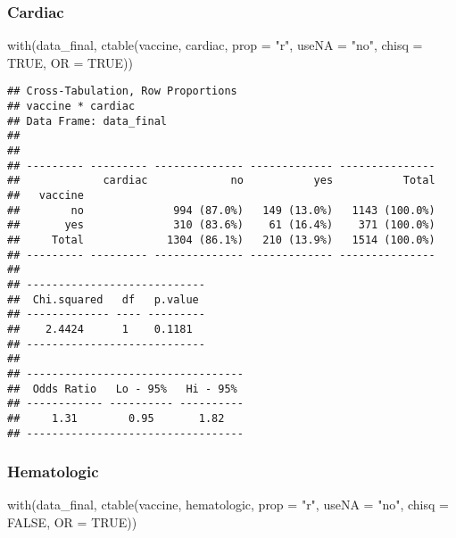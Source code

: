 \documentclass[
]{article}
\newenvironment{Shaded}{\begin{snugshade}}{\end{snugshade}}
\newcommand{\AttributeTok}[1]{\textcolor[rgb]{0.77,0.63,0.00}{#1}}
\newcommand{\ConstantTok}[1]{\textcolor[rgb]{0.00,0.00,0.00}{#1}}
\newcommand{\FunctionTok}[1]{\textcolor[rgb]{0.00,0.00,0.00}{#1}}
\newcommand{\NormalTok}[1]{#1}
\newcommand{\StringTok}[1]{\textcolor[rgb]{0.31,0.60,0.02}{#1}}
\begin{document}
\hypertarget{cardiac}{%
\subsubsection{Cardiac}\label{cardiac}}

\begin{Shaded}
\begin{Highlighting}[]
\FunctionTok{with}\NormalTok{(data\_final, }\FunctionTok{ctable}\NormalTok{(vaccine, cardiac, }\AttributeTok{prop =} \StringTok{"r"}\NormalTok{, }\AttributeTok{useNA =} \StringTok{"no"}\NormalTok{, }\AttributeTok{chisq =} \ConstantTok{TRUE}\NormalTok{, }\AttributeTok{OR =} \ConstantTok{TRUE}\NormalTok{))}
\end{Highlighting}
\end{Shaded}

\begin{verbatim}
## Cross-Tabulation, Row Proportions  
## vaccine * cardiac  
## Data Frame: data_final  
## 
## 
## --------- --------- -------------- ------------- ---------------
##             cardiac             no           yes           Total
##   vaccine                                                       
##        no              994 (87.0%)   149 (13.0%)   1143 (100.0%)
##       yes              310 (83.6%)    61 (16.4%)    371 (100.0%)
##     Total             1304 (86.1%)   210 (13.9%)   1514 (100.0%)
## --------- --------- -------------- ------------- ---------------
## 
## ----------------------------
##  Chi.squared   df   p.value 
## ------------- ---- ---------
##    2.4424      1    0.1181  
## ----------------------------
## 
## ----------------------------------
##  Odds Ratio   Lo - 95%   Hi - 95% 
## ------------ ---------- ----------
##     1.31        0.95       1.82   
## ----------------------------------
\end{verbatim}

\hypertarget{hematologic}{%
\subsubsection{Hematologic}\label{hematologic}}

\begin{Shaded}
\begin{Highlighting}[]
\FunctionTok{with}\NormalTok{(data\_final, }\FunctionTok{ctable}\NormalTok{(vaccine, hematologic, }\AttributeTok{prop =} \StringTok{"r"}\NormalTok{, }\AttributeTok{useNA =} \StringTok{"no"}\NormalTok{, }\AttributeTok{chisq =} \ConstantTok{FALSE}\NormalTok{, }\AttributeTok{OR =} \ConstantTok{TRUE}\NormalTok{))}
\end{Highlighting}
\end{Shaded}
\end{document}
